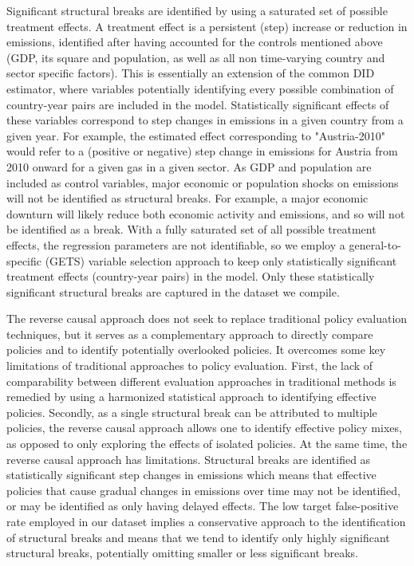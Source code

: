 \documentclass[a4paper]{article}
\begin{document}
Significant structural breaks are identified by using a saturated set of possible treatment effects. A treatment effect is a persistent (step) increase or reduction in emissions, identified after having accounted for the controls mentioned above (GDP, its square and population, as well as all non time-varying country and sector specific factors). This is essentially an extension of the common DID estimator, where variables potentially identifying every possible combination of country-year pairs are included in the model. Statistically significant effects of these variables correspond to step changes in emissions in a given country from a given year. For example, the estimated effect corresponding to "Austria-2010" would refer to a (positive or negative) step change in emissions for Austria from 2010 onward for a given gas in a given sector. As GDP and population are included as control variables, major economic or population shocks on emissions will not be identified as structural breaks. For example, a major economic downturn will likely reduce both economic activity and emissions, and so will not be identified as a break. With a fully saturated set of all possible treatment effects, the regression parameters are not identifiable, so we employ a general-to-specific (GETS) variable selection approach to keep only statistically significant treatment effects (country-year pairs) in the model. Only these statistically significant structural breaks are captured in the dataset we compile.

The reverse causal approach does not seek to replace traditional policy evaluation techniques, but it serves as a complementary approach to directly compare policies and to identify potentially overlooked policies. It overcomes some key limitations of traditional approaches to policy evaluation. First, the lack of comparability between different evaluation approaches in traditional methods is remedied by using a harmonized statistical approach to identifying effective policies. Secondly, as a single structural break can be attributed to multiple policies, the reverse causal approach allows one to identify effective policy mixes, as opposed to only exploring the effects of isolated policies. At the same time, the reverse causal approach has limitations. Structural breaks are identified as statistically significant step changes in emissions which means that effective policies that cause gradual changes in emissions over time may not be identified, or may be identified as only having delayed effects. The low target false-positive rate employed in our dataset implies a conservative approach to the identification of structural breaks and means that we tend to identify only highly significant structural breaks, potentially omitting smaller or less significant breaks.
\end{document}
